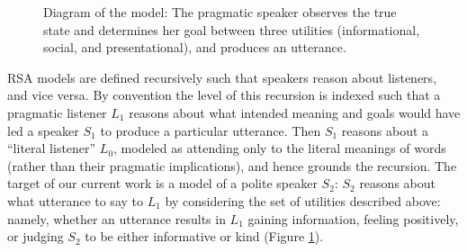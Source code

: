 \documentclass[12pt]{article}
\begin{document}


\begin{figure}
\centering
\caption{\label{fig:model}Diagram of the model: The pragmatic speaker observes the true state and determines her goal between three utilities (informational, social, and presentational), and produces an utterance.
}
\end{figure}


RSA models are defined recursively such that speakers reason about
listeners, and vice versa. By convention the level of this recursion is
indexed such that a pragmatic listener \(L_1\) reasons about what
intended meaning and goals would have led a speaker \(S_1\) to produce a
particular utterance. Then \(S_1\) reasons about a \enquote{literal
listener} \(L_0\), modeled as attending only to the literal meanings of
words (rather than their pragmatic implications), and hence grounds the
recursion. The target of our current work is a model of a polite speaker
\(S_2\): \(S_2\) reasons about what utterance to say to \(L_1\) by
considering the set of utilities described above: namely, whether an
utterance results in \(L_1\) gaining information, feeling positively, or
judging \(S_2\) to be either informative or kind (Figure
\ref{fig:model}).
\end{document}
